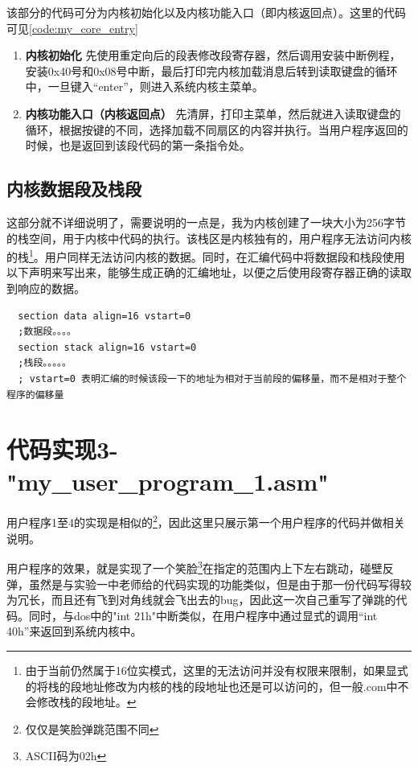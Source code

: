 \documentclass[forprint]{WHUBachelor}
\begin{document}
该部分的代码可分为内核初始化以及内核功能入口（即内核返回点）。这里的代码可见\autoref{code:my_core_entry}\\
\begin{enumerate}
  \item \textbf{内核初始化} 先使用重定向后的段表修改段寄存器，然后调用安装中断例程，安装0x40号和0x08号中断，最后打印完内核加载消息后转到读取键盘的循环中，一旦键入“enter”，则进入系统内核主菜单。
  \item \textbf{内核功能入口（内核返回点）} 先清屏，打印主菜单，然后就进入读取键盘的循环，根据按键的不同，选择加载不同扇区的内容并执行。当用户程序返回的时候，也是返回到该段代码的第一条指令处。
\end{enumerate}

\subsection{内核数据段及栈段}

这部分就不详细说明了，需要说明的一点是，我为内核创建了一块大小为256字节的栈空间，用于内核中代码的执行。该栈区是内核独有的，用户程序无法访问内核的栈\footnote{由于当前仍然属于16位实模式，这里的无法访问并没有权限来限制，如果显式的将栈的段地址修改为内核的栈的段地址也还是可以访问的，但一般.com中不会修改栈的段地址。}。用户同样无法访问内核的数据。同时，在汇编代码中将数据段和栈段使用以下声明来写出来，能够生成正确的汇编地址，以便之后使用段寄存器正确的读取到响应的数据。 \\

\begin{lstlisting}
  section data align=16 vstart=0
  ;数据段。。。。
  section stack align=16 vstart=0
  ;栈段。。。。。 
  ; vstart=0 表明汇编的时候该段一下的地址为相对于当前段的偏移量，而不是相对于整个程序的偏移量
\end{lstlisting}

\section{代码实现3-"my\_user\_program\_1.asm"}

用户程序1至4的实现是相似的\footnote{仅仅是笑脸弹跳范围不同}，因此这里只展示第一个用户程序的代码并做相关说明。

用户程序的效果，就是实现了一个笑脸\footnote{ASCII码为02h}在指定的范围内上下左右跳动，碰壁反弹，虽然是与实验一中老师给的代码实现的功能类似，但是由于那一份代码写得较为冗长，而且还有飞到对角线就会飞出去的bug，因此这一次自己重写了弹跳的代码。同时，与dos中的"int 21h"中断类似，在用户程序中通过显式的调用“int 40h”来返回到系统内核中。
\end{document}
